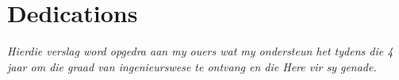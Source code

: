 \chapter{Dedications}%
 \vfill
 \begin{Afr}
 \begin{center}\itshape
    Hierdie verslag word opgedra aan my ouers wat my ondersteun het tydens die 4 jaar om die graad van ingenieurswese te ontvang en die Here vir sy genade. 
 \end{center}
 \end{Afr}
 \vfill
 \clearpage

\endinput
